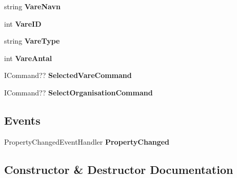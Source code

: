 \begin{DoxyCompactItemize}
\item 
\mbox{\label{class_r_f_storage_1_1_view_model_1_1_organisation_v_m_a4b480758536196e361b9ceec49350c10}} 
string {\bfseries Vare\+Navn}\hspace{0.3cm}{\ttfamily  [get, set]}
\item 
\mbox{\label{class_r_f_storage_1_1_view_model_1_1_organisation_v_m_ab40feb5f3fe78e15c9164081a757203b}} 
int {\bfseries Vare\+ID}\hspace{0.3cm}{\ttfamily  [get, set]}
\item 
\mbox{\label{class_r_f_storage_1_1_view_model_1_1_organisation_v_m_ad04e3fb691ab86ad4b6ce99fbe113a30}} 
string {\bfseries Vare\+Type}\hspace{0.3cm}{\ttfamily  [get, set]}
\item 
\mbox{\label{class_r_f_storage_1_1_view_model_1_1_organisation_v_m_ae566540e01a19709b0da6c6d990bd994}} 
int {\bfseries Vare\+Antal}\hspace{0.3cm}{\ttfamily  [get, set]}
\item 
\mbox{\label{class_r_f_storage_1_1_view_model_1_1_organisation_v_m_aed95554c00b1c24dbbb4db04b175ff9d}} 
I\+Command?? {\bfseries Selected\+Vare\+Command}\hspace{0.3cm}{\ttfamily  [get, set]}
\item 
\mbox{\label{class_r_f_storage_1_1_view_model_1_1_organisation_v_m_a757f1401e62b7934a54380514dc082f8}} 
I\+Command?? {\bfseries Select\+Organisation\+Command}\hspace{0.3cm}{\ttfamily  [get, set]}
\end{DoxyCompactItemize}
\subsection*{Events}
\begin{DoxyCompactItemize}
\item 
\mbox{\label{class_r_f_storage_1_1_view_model_1_1_organisation_v_m_a02a2466709a41a0bf8e82f3af93181fa}} 
Property\+Changed\+Event\+Handler {\bfseries Property\+Changed}
\end{DoxyCompactItemize}


\subsection{Constructor \& Destructor Documentation}
\mbox{\label{class_r_f_storage_1_1_view_model_1_1_organisation_v_m_ad360a4cd203de421d6ccf82e7745ee52}} 
